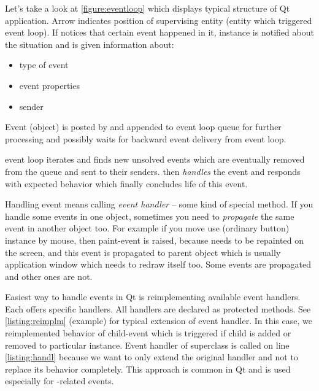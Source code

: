 Let's take a look at \autoref{figure:eventloop} which displays typical structure of Qt application.  Arrow indicates position of supervising entity (entity which triggered event loop). If notices that certain event happened in it, instance is notified about the situation and is given information about:
\begin{itemize}
\item type of event
\item event properties
\item sender
\end{itemize}
Event (object) is posted by and appended to event loop queue for further processing and possibly waits for backward event delivery from event loop.

\indent{} event loop iterates and finds new unsolved events which are eventually removed from the queue and sent to their senders. then \textit{handles} the event and responds with expected behavior which finally concludes life of this event.

Handling event means calling \textit{event handler} -- some kind of special method. If you handle some events in one object, sometimes you need to \textit{propagate} the same event in another object too. For example if you move use (ordinary button) instance by mouse, then paint-event is raised, because needs to be repainted on the screen, and this event is propagated to parent object which is usually application window which needs to redraw itself too. Some events are propagated and other ones are not.

Easiest way to handle events in Qt is reimplementing available event handlers. Each offers specific handlers. All handlers are declared as protected methods. See \autoref{listing:reimplm} (example) for typical extension of event handler. In this case, we reimplemented behavior of child-event which is triggered if child is added or removed to particular instance. Event handler of superclass is called on line \ref{listing:handl} because we want to only extend the original handler and not to replace its behavior completely. This approach is common in Qt and is used especially for -related events.

